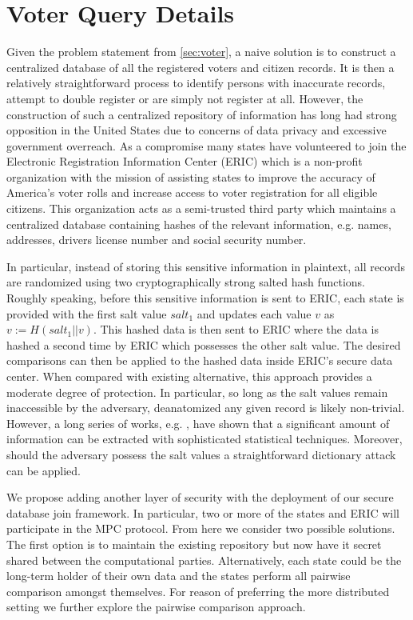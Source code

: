 \section{Voter Query Details}\label{sec:voterDetails}

Given the problem statement from \ref{sec:voter}, a naive solution is to construct a centralized database of all the registered voters and citizen records. It is then a relatively straightforward process to identify persons with inaccurate records, attempt to double register or are simply not register at all. However, the construction of such a centralized repository of information has long had strong opposition in the United States due to concerns of data privacy and  excessive government overreach. As a compromise many states have volunteered to join the Electronic Registration Information Center (ERIC)\cite{eric} which is a non-profit organization with the mission of assisting states to improve the accuracy of America’s voter rolls and increase access to voter registration for all eligible citizens. This organization acts as a semi-trusted third party which maintains a centralized database containing hashes of the relevant information, e.g. names, addresses, drivers license number and social security number. 


In particular, instead of storing this sensitive information in plaintext, all records are randomized using two cryptographically strong salted hash functions. Roughly speaking, before this sensitive information is sent to ERIC, each state is provided with the first salt value $salt_1$ and updates each value $v$ as $v := H(salt_1 || v)$. This hashed data is then sent to ERIC where the data is hashed a second time by ERIC which possesses the other salt value. The desired comparisons can then be applied to the hashed data inside ERIC's secure data center. When compared with existing alternative, this approach provides a moderate degree of protection. In particular, so long as the salt values remain inaccessible by the adversary, deanatomized any given record is likely non-trivial. However, a long series of works, e.g. \cite{deanon0,deanon1,deanon2,deanon3,deanon4}, have shown that a significant amount of information can be extracted with sophisticated statistical techniques. Moreover, should the adversary possess the salt values a straightforward dictionary attack can be applied.

We propose adding another layer of security with the deployment of our secure database join framework. In particular, two or more of the states and ERIC will participate in the MPC protocol. From here we consider two possible solutions. The first option is to maintain the existing repository but now have it secret shared between the computational parties. Alternatively, each state could be the long-term holder of their own data and the states perform all pairwise comparison amongst themselves. For reason of preferring the more distributed setting we further explore the pairwise comparison approach. 


